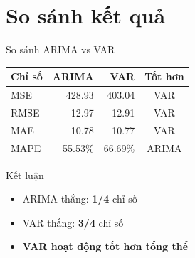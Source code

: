 \documentclass[serif, aspectratio=169]{beamer}
\newcommand{\highlight}[1]{\textbf{\color{hkustblue}#1}}
\newcommand{\red}[1]{\textbf{\color{hkustred}#1}}
\begin{document}
\section{So sánh kết quả}

\begin{frame}{So sánh ARIMA vs VAR}
    \begin{center}
        \begin{tabular}{|l|r|r|c|}
            \hline
            \textbf{Chỉ số} & \textbf{ARIMA} & \textbf{VAR} & \textbf{Tốt hơn} \\ \hline
            MSE & 428.93 & 403.04 & VAR \\ \hline
            RMSE & 12.97 & 12.91 & VAR \\ \hline
            MAE & 10.78 & 10.77 & VAR \\ \hline
            MAPE & 55.53\% & 66.69\% & ARIMA \\ \hline
        \end{tabular}
    \end{center}
    
    \vspace{0.4cm}
    \begin{alertblock}{Kết luận}
        \begin{itemize}
            \item ARIMA thắng: \red{1/4} chỉ số
            \item VAR thắng: \red{3/4} chỉ số
            \item \highlight{VAR hoạt động tốt hơn tổng thể}
        \end{itemize}
    \end{alertblock}
\end{frame}
\end{document}
